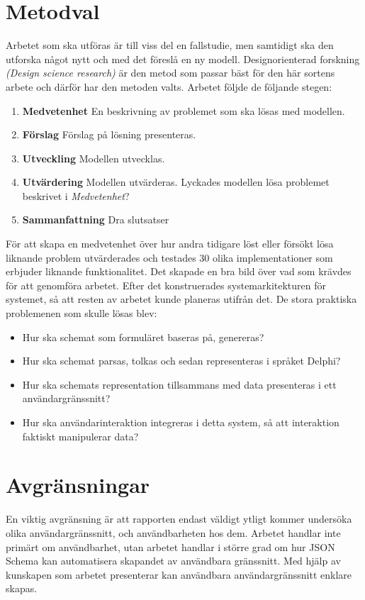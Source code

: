 \section{Metodval}
\label{sec:intro:metodval}
Arbetet som ska utföras är till viss del en fallstudie, men samtidigt ska den utforska något nytt och med det föreslå en ny modell. Designorienterad forskning \textit{(Design science research)} är den metod som passar bäst för den här sortens arbete och därför har den metoden valts.
\noindent
Arbetet följde de följande stegen:

\begin{enumerate}
	\item \textbf{Medvetenhet} En beskrivning av problemet som ska lösas med modellen.
	\item \textbf{Förslag} Förslag på lösning presenteras.
	\item \textbf{Utveckling} Modellen utvecklas.
	\item \textbf{Utvärdering} Modellen utvärderas. Lyckades modellen lösa problemet beskrivet i \textit{Medvetenhet}?
	\item \textbf{Sammanfattning} Dra slutsatser
\end{enumerate}

\noindent
För att skapa en medvetenhet över hur andra tidigare löst eller försökt lösa liknande problem utvärderades och testades 30 olika implementationer som erbjuder liknande funktionalitet. Det skapade en bra bild över vad som krävdes för att genomföra arbetet. Efter det konstruerades systemarkitekturen för systemet, så att resten av arbetet kunde planeras utifrån det. De stora praktiska problemenen som skulle lösas blev:

\begin{itemize}
	\item Hur ska schemat som formuläret baseras på, genereras?
	\item Hur ska schemat parsas, tolkas och sedan representeras i språket Delphi?
	\item Hur ska schemats representation tillsammans med data presenteras i ett användargränssnitt?
	\item Hur ska användarinteraktion integreras i detta system, så att interaktion faktiskt manipulerar data?
\end{itemize}

\section{Avgränsningar}
\label{sec:intro:avgränsningar}
En viktig avgränsning är att rapporten endast väldigt ytligt kommer undersöka olika användargränssnitt, och användbarheten hos dem. Arbetet handlar inte primärt om användbarhet, utan arbetet handlar i större grad om hur JSON Schema kan automatisera skapandet av användbara gränssnitt. Med hjälp av kunskapen som arbetet presenterar kan användbara användargränssnitt enklare skapas.

